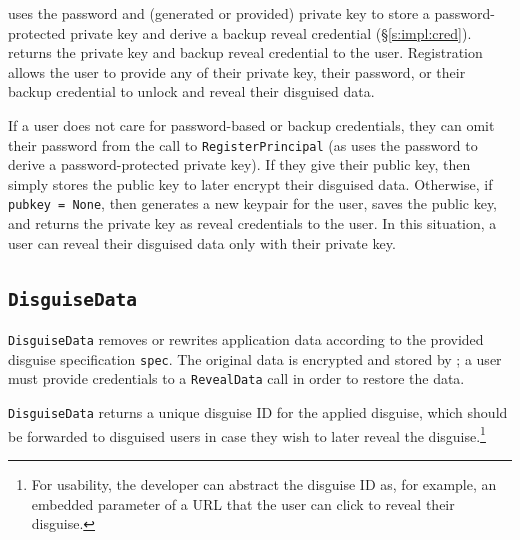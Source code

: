     \sys uses the password and (generated or provided) private key to store a
    password-pro\-tected private key and derive a backup reveal credential
    (\S\ref{s:impl:cred}). \sys returns the private key and backup reveal
    credential to the user. Registration allows the user to provide
    any of their private key, their password, or their backup credential to
    unlock and reveal their disguised data.

    If a user does not care for password-based or backup credentials, they can
    omit their password from the call to \texttt{RegisterPrincipal} (as \sys
    uses the password to derive a password-protected private key).  If they give
    \sys their public key, then \sys simply stores the public key to later
    encrypt their disguised data. Otherwise, if \texttt{pubkey = None}, then
    \sys generates a new keypair for the user, saves the public key, and returns
    the private key as reveal credentials to the user.  In this situation, a
    user can reveal their disguised data only with their private key.
        
\subsection{\texttt{DisguiseData}}
    \texttt{DisguiseData} removes or rewrites application data according to the
    provided disguise specification \texttt{spec}. The original data is
    encrypted and stored by \sys; a user must provide credentials to a
    \texttt{RevealData} call in order to restore the data.

    \texttt{DisguiseData} returns a unique disguise ID for the applied disguise,
    which should be forwarded to disguised users in case they wish to later
    reveal the disguise.\footnote{For usability, the developer can abstract the
    disguise ID as, for example, an embedded parameter of a URL that the user
    can click to reveal their disguise.}

